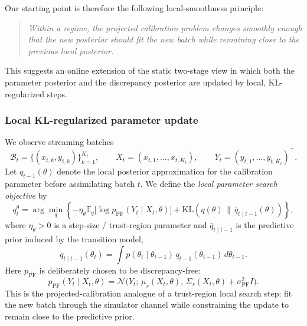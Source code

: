 \documentclass{article}
\begin{document}
Our starting point is therefore the following local-smoothness principle:

\begin{quote}
\emph{Within a regime, the projected calibration problem changes smoothly enough that the new posterior should fit the new batch while remaining close to the previous local posterior.}
\end{quote}

This suggests an online extension of the static two-stage view in which both the parameter posterior and the discrepancy posterior are updated by local, KL-regularized steps.

\subsubsection{Local KL-regularized parameter update}
\label{sec:theta_kl_update}

We observe streaming batches
\begin{equation}
\mathcal B_t=\{(x_{t,k},y_{t,k})\}_{k=1}^{K_t},
\qquad
X_t=(x_{t,1},\ldots,x_{t,K_t}),
\qquad
Y_t=(y_{t,1},\ldots,y_{t,K_t})^\top .
\end{equation}
Let $q_{t-1}(\theta)$ denote the local posterior approximation for the calibration parameter before assimilating batch $t$. We define the \emph{local parameter search objective} by
\begin{equation}
q_t^\theta
=
\arg\min_{q}
\left\{
-\eta_\theta
\mathbb E_q
\big[
\log p_{\mathrm{PF}}(Y_t\mid X_t,\theta)
\big]
+
\mathrm{KL}\!\left(q(\theta)\,\|\,\bar q_{t\mid t-1}(\theta)\right)
\right\},
\label{eq:theta_online_objective}
\end{equation}
where $\eta_\theta>0$ is a step-size / trust-region parameter and $\bar q_{t\mid t-1}$ is the predictive prior induced by the transition model,
\begin{equation}
\bar q_{t\mid t-1}(\theta_t)
=
\int
p(\theta_t\mid \theta_{t-1})\,q_{t-1}(\theta_{t-1})
\,d\theta_{t-1}.
\label{eq:theta_predictive_prior}
\end{equation}
Here $p_{\mathrm{PF}}$ is deliberately chosen to be discrepancy-free:
\begin{equation}
p_{\mathrm{PF}}(Y_t\mid X_t,\theta)
=
\mathcal N\!\big(
Y_t;\,
\mu_s(X_t,\theta),\,
\Sigma_s(X_t,\theta)+\sigma_{\mathrm{PF}}^2 I
\big).
\label{eq:theta_pf_likelihood}
\end{equation}
This is the projected-calibration analogue of a trust-region local search step: fit the new batch through the simulator channel while constraining the update to remain close to the predictive prior.
\end{document}
